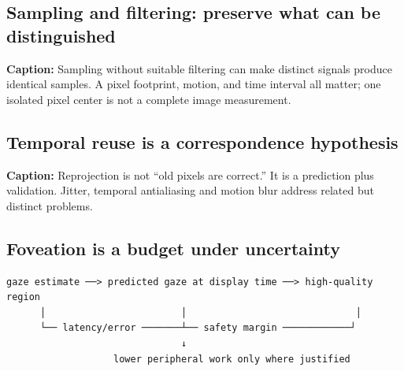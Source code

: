 \subsection{Sampling and filtering: preserve what can be distinguished}\label{appendix-73c6b8ed5a87-sampling-and-filtering-preserve-what-can-be-distinguished}

\hypertarget{appendix-73c6b8ed5a87-sampling-and-filtering-preserve-what-can-be-distinguished}{}


\textbf{Caption:} Sampling without suitable filtering can make distinct signals produce identical samples. A pixel footprint, motion, and time interval all matter; one isolated pixel center is not a complete image measurement.

\subsection{Temporal reuse is a correspondence hypothesis}\label{appendix-73c6b8ed5a87-temporal-reuse-is-a-correspondence-hypothesis}

\hypertarget{appendix-73c6b8ed5a87-temporal-reuse-is-a-correspondence-hypothesis}{}


\textbf{Caption:} Reprojection is not ``old pixels are correct.'' It is a prediction plus validation. Jitter, temporal antialiasing and motion blur address related but distinct problems.

\subsection{Foveation is a budget under uncertainty}\label{appendix-73c6b8ed5a87-foveation-is-a-budget-under-uncertainty}

\hypertarget{appendix-73c6b8ed5a87-foveation-is-a-budget-under-uncertainty}{}

\begin{verbatim}
gaze estimate ──> predicted gaze at display time ──> high-quality region
      │                        │                              │
      └── latency/error ───────┴── safety margin ────────────┘
                               ↓
                   lower peripheral work only where justified
\end{verbatim}

